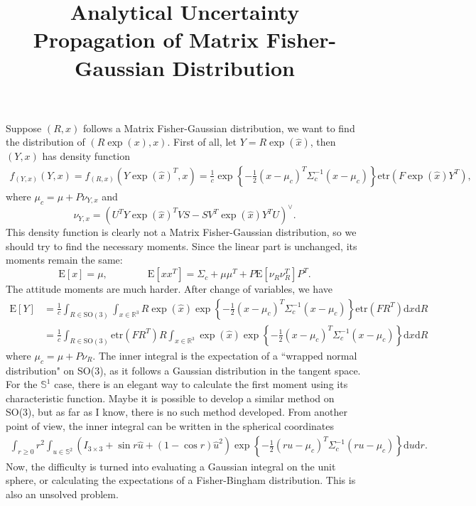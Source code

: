 \documentclass[10pt]{article}
\title{\vspace{-4ex}\textbf{Analytical Uncertainty Propagation of Matrix Fisher-Gaussian Distribution\vspace{-4ex}}}
\date{}
\begin{document}
\maketitle

Suppose $(R,x)$ follows a Matrix Fisher-Gaussian distribution, we want to find the distribution of $(R\exp(x),x)$.
First of all, let $Y=R\exp(\hat{x})$, then $(Y,x)$ has density function
\begin{align}
	f_{(Y,x)}(Y,x) = f_{(R,x)}(Y\exp(\hat{x})^T,x) = \frac{1}{c}\exp\left\{-\frac{1}{2}(x-\mu_c)^T\Sigma_c^{-1}(x-\mu_c)\right\}\mathrm{etr}(F\exp(\hat{x})Y^T),
\end{align}
where $\mu_c=\mu+P\nu_{Y,x}$ and
\begin{equation}
	\nu_{Y,x}=(U^TY\exp(\hat{x})^TVS-SV^T\exp(\hat{x})Y^TU)^\vee.
\end{equation}
This density function is clearly not a Matrix Fisher-Gaussian distribution, so we should try to find the necessary moments.
Since the linear part is unchanged, its moments remain the same:
\begin{equation}
	\mathrm{E}[x] = \mu, \qquad \qquad \mathrm{E}[xx^T] = \Sigma_c+\mu\mu^T+P\mathrm{E}[\nu_R\nu_R^T]P^T.
\end{equation}
The attitude moments are much harder.
After change of variables, we have
\begin{align}
	\mathrm{E}[Y] &= \frac{1}{c}\int_{R\in\mathrm{SO}(3)}\int_{x\in\mathbb{R}^3}R\exp(\hat{x})\exp\left\{-\frac{1}{2}(x-\mu_c)^T\Sigma_c^{-1}(x-\mu_c)\right\}\mathrm{etr}(FR^T)\mathrm{d}x\mathrm{d}R \nonumber \\
	&= \frac{1}{c}\int_{R\in\mathrm{SO}(3)}\mathrm{etr}(FR^T)R\int_{x\in\mathbb{R}^3}\exp(\hat{x})\exp\left\{-\frac{1}{2}(x-\mu_c)^T\Sigma_c^{-1}(x-\mu_c)\right\}\mathrm{d}x\mathrm{d}R
\end{align}
where $\mu_c=\mu+P\nu_R$.
The inner integral is the expectation of a ``wrapped normal distribution" on SO(3), as it follows a Gaussian distribution in the tangent space.
For the $\mathbb{S}^1$ case, there is an elegant way to calculate the first moment using its characteristic function.
Maybe it is possible to develop a similar method on SO(3), but as far as I know, there is no such method developed.
From another point of view, the inner integral can be written in the spherical coordinates
\begin{align}
	\int_{r\geq 0}r^2\int_{u\in\mathbb{S}^2}\left(I_{3\times 3}+\sin r\hat{u}+(1-\cos r)\hat{u}^2\right)\exp\left\{-\frac{1}{2}(ru-\mu_c)^T\Sigma_c^{-1}(ru-\mu_c)\right\}\mathrm{d}u\mathrm{d}r.
\end{align}
Now, the difficulty is turned into evaluating a Gaussian integral on the unit sphere, or calculating the expectations of a Fisher-Bingham distribution.
This is also an unsolved problem.
\end{document}
